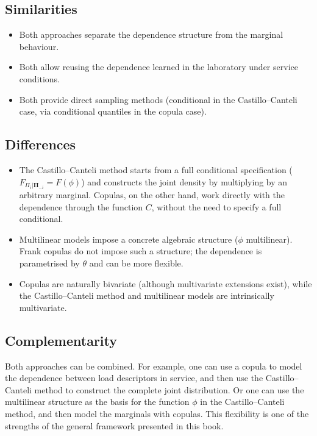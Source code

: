 \subsection{Similarities}

\begin{itemize}
    \item Both approaches separate the dependence structure from the marginal behaviour.
    \item Both allow reusing the dependence learned in the laboratory under service conditions.
    \item Both provide direct sampling methods (conditional in the Castillo–Canteli case, via conditional quantiles in the copula case).
\end{itemize}

\subsection{Differences}

\begin{itemize}
    \item The Castillo–Canteli method starts from a full conditional specification (\(F_{\Pi_i|\boldsymbol{\Pi}_{-i}} = F(\phi)\)) and constructs the joint density by multiplying by an arbitrary marginal. Copulas, on the other hand, work directly with the dependence through the function \(C\), without the need to specify a full conditional.
    \item Multilinear models impose a concrete algebraic structure (\(\phi\) multilinear). Frank copulas do not impose such a structure; the dependence is parametrised by \(\theta\) and can be more flexible.
    \item Copulas are naturally bivariate (although multivariate extensions exist), while the Castillo–Canteli method and multilinear models are intrinsically multivariate.
\end{itemize}

\subsection{Complementarity}

Both approaches can be combined. For example, one can use a copula to model the dependence between load descriptors in service, and then use the Castillo–Canteli method to construct the complete joint distribution. Or one can use the multilinear structure as the basis for the function \(\phi\) in the Castillo–Canteli method, and then model the marginals with copulas. This flexibility is one of the strengths of the general framework presented in this book.

